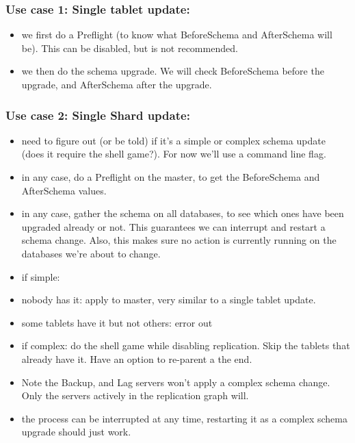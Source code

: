 \subsubsection{Use case 1: Single tablet update:}\hypertarget{use-case-1-single-tablet-update}{}\label{use-case-1-single-tablet-update}

\begin{itemize}
\item we first do a Preflight (to know what BeforeSchema and AfterSchema will be). This can be disabled, but is not recommended.
\item we then do the schema upgrade. We will check BeforeSchema before the upgrade, and AfterSchema after the upgrade.
\end{itemize}

\subsubsection{Use case 2: Single Shard update:}\hypertarget{use-case-2-single-shard-update}{}\label{use-case-2-single-shard-update}

\begin{itemize}
\item need to figure out (or be told) if it’s a simple or complex schema update (does it require the shell game?). For now we'll use a command line flag.
\item in any case, do a Preflight on the master, to get the BeforeSchema and AfterSchema values.
\item in any case, gather the schema on all databases, to see which ones have been upgraded already or not. This guarantees we can interrupt and restart a schema change. Also, this makes sure no action is currently running on the databases we're about to change.
\item if simple:
\item nobody has it: apply to master, very similar to a single tablet update.
\item some tablets have it but not others: error out
\item if complex: do the shell game while disabling replication. Skip the tablets that already have it. Have an option to re-parent a the end.
\item Note the Backup, and Lag servers won't apply a complex schema change. Only the servers actively in the replication graph will.
\item the process can be interrupted at any time, restarting it as a complex schema upgrade should just work.
\end{itemize}

